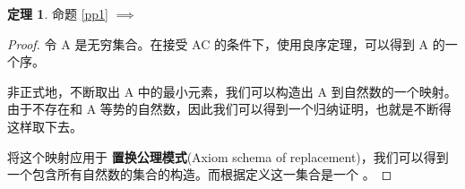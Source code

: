 \documentclass{ctexart}
\theoremstyle{definition}
\newtheorem{theorem}{定理}[section]
\begin{document}
\begin{theorem}
  命题 \ref{pp1} $\implies$ 
\end{theorem}

\begin{proof}
  令 A 是无穷集合。在接受 AC 的条件下，使用良序定理，可以得到 A 的一个序。

  非正式地，不断取出 A 中的最小元素，我们可以构造出 A 到自然数的一个映射。由于不存在和 A 等势的自然数，因此我们可以得到一个归纳证明，也就是不断得这样取下去。

  将这个映射应用于 \textbf{置换公理模式}(Axiom schema of replacement)，我们可以得到一个包含所有自然数的集合的构造。而根据定义这一集合是一个 。
\end{proof}
\end{document}

